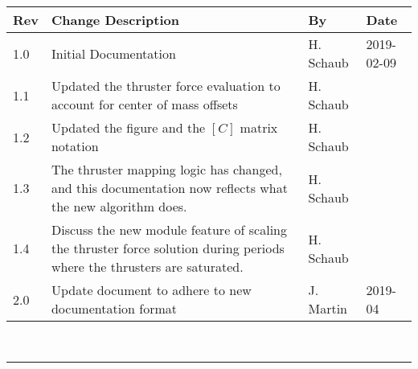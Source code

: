 \documentclass[]{BasiliskReportMemo}
\begin{document}
\makeCover
%
%
\pagestyle{empty}
{\renewcommand{\arraystretch}{2}
\noindent
\begin{longtable}{|p{0.5in}|p{3.5in}|p{1.07in}|p{0.9in}|}
\hline
{\bfseries Rev} & {\bfseries Change Description} & {\bfseries By}& {\bfseries Date} \\
\hline
1.0 & Initial Documentation & H. Schaub & 2019-02-09\\
\hline
1.1 & Updated the thruster force evaluation to account for center of mass offsets & H. Schaub & \\
\hline
1.2 & Updated the figure and the $[C]$ matrix notation & H. Schaub & \\
\hline
1.3 & The thruster mapping logic has changed, and this documentation now reflects what the new algorithm does. & H. Schaub & \\
\hline
1.4 & Discuss the new module feature of scaling the thruster force solution during periods where the thrusters are saturated. & H. Schaub & \\
\hline
2.0 & Update document to adhere to new documentation format & J. Martin & 2019-04 \\
\hline

\end{longtable}
}



\newpage
\setcounter{page}{1}
\pagestyle{fancy}

\tableofcontents %
~\\ \hrule ~\\ %



	






\end{document}
